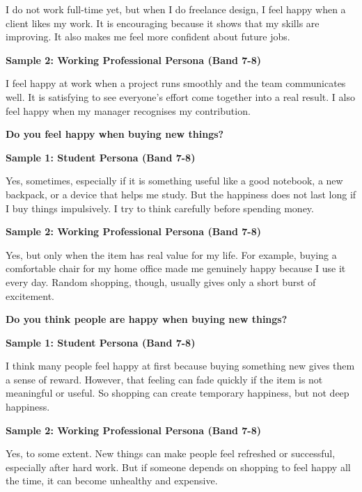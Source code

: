 I do not work full-time yet, but when I do freelance design, I feel happy when a client likes my work. It is encouraging because it shows that my skills are improving. It also makes me feel more confident about future jobs.

\textbf{Sample 2: Working Professional Persona (Band 7-8)}

I feel happy at work when a project runs smoothly and the team communicates well. It is satisfying to see everyone's effort come together into a real result. I also feel happy when my manager recognises my contribution.

\separator

\begin{ieltsquestion}
\textbf{Do you feel happy when buying new things?}
\end{ieltsquestion}
\textbf{Sample 1: Student Persona (Band 7-8)}

Yes, sometimes, especially if it is something useful like a good notebook, a new backpack, or a device that helps me study. But the happiness does not last long if I buy things impulsively. I try to think carefully before spending money.

\textbf{Sample 2: Working Professional Persona (Band 7-8)}

Yes, but only when the item has real value for my life. For example, buying a comfortable chair for my home office made me genuinely happy because I use it every day. Random shopping, though, usually gives only a short burst of excitement.

\separator

\begin{ieltsquestion}
\textbf{Do you think people are happy when buying new things?}
\end{ieltsquestion}
\textbf{Sample 1: Student Persona (Band 7-8)}

I think many people feel happy at first because buying something new gives them a sense of reward. However, that feeling can fade quickly if the item is not meaningful or useful. So shopping can create temporary happiness, but not deep happiness.

\textbf{Sample 2: Working Professional Persona (Band 7-8)}

Yes, to some extent. New things can make people feel refreshed or successful, especially after hard work. But if someone depends on shopping to feel happy all the time, it can become unhealthy and expensive.

\separator

